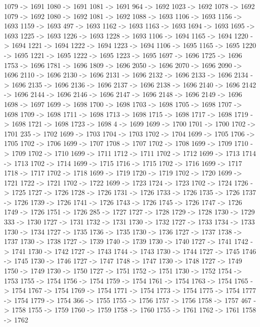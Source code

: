 {	1079 -> 1691
	1080 -> 1691
	1081 -> 1691
	964 -> 1692
	1023 -> 1692
	1078 -> 1692
	1079 -> 1692
	1080 -> 1692
	1081 -> 1692
	1088 -> 1693
	1106 -> 1693
	1156 -> 1693
	1159 -> 1693
	497 -> 1693
	1162 -> 1693
	1163 -> 1693
	1694 -> 1693
	1695 -> 1693
	1225 -> 1693
	1226 -> 1693
	1228 -> 1693
	1106 -> 1694
	1165 -> 1694
	1220 -> 1694
	1221 -> 1694
	1222 -> 1694
	1223 -> 1694
	1106 -> 1695
	1165 -> 1695
	1220 -> 1695
	1221 -> 1695
	1222 -> 1695
	1223 -> 1695
	1697 -> 1696
	1725 -> 1696
	1753 -> 1696
	1781 -> 1696
	1809 -> 1696
	2050 -> 1696
	2070 -> 1696
	2090 -> 1696
	2110 -> 1696
	2130 -> 1696
	2131 -> 1696
	2132 -> 1696
	2133 -> 1696
	2134 -> 1696
	2135 -> 1696
	2136 -> 1696
	2137 -> 1696
	2138 -> 1696
	2140 -> 1696
	2142 -> 1696
	2144 -> 1696
	2146 -> 1696
	2147 -> 1696
	2148 -> 1696
	2149 -> 1696
	1698 -> 1697
	1699 -> 1698
	1700 -> 1698
	1703 -> 1698
	1705 -> 1698
	1707 -> 1698
	1709 -> 1698
	1711 -> 1698
	1713 -> 1698
	1715 -> 1698
	1717 -> 1698
	1719 -> 1698
	1721 -> 1698
	1723 -> 1698
	4 -> 1699
	1699 -> 1700
	1701 -> 1700
	1702 -> 1701
	235 -> 1702
	1699 -> 1703
	1704 -> 1703
	1702 -> 1704
	1699 -> 1705
	1706 -> 1705
	1702 -> 1706
	1699 -> 1707
	1708 -> 1707
	1702 -> 1708
	1699 -> 1709
	1710 -> 1709
	1702 -> 1710
	1699 -> 1711
	1712 -> 1711
	1702 -> 1712
	1699 -> 1713
	1714 -> 1713
	1702 -> 1714
	1699 -> 1715
	1716 -> 1715
	1702 -> 1716
	1699 -> 1717
	1718 -> 1717
	1702 -> 1718
	1699 -> 1719
	1720 -> 1719
	1702 -> 1720
	1699 -> 1721
	1722 -> 1721
	1702 -> 1722
	1699 -> 1723
	1724 -> 1723
	1702 -> 1724
	1726 -> 1725
	1727 -> 1726
	1728 -> 1726
	1731 -> 1726
	1733 -> 1726
	1735 -> 1726
	1737 -> 1726
	1739 -> 1726
	1741 -> 1726
	1743 -> 1726
	1745 -> 1726
	1747 -> 1726
	1749 -> 1726
	1751 -> 1726
	285 -> 1727
	1727 -> 1728
	1729 -> 1728
	1730 -> 1729
	333 -> 1730
	1727 -> 1731
	1732 -> 1731
	1730 -> 1732
	1727 -> 1733
	1734 -> 1733
	1730 -> 1734
	1727 -> 1735
	1736 -> 1735
	1730 -> 1736
	1727 -> 1737
	1738 -> 1737
	1730 -> 1738
	1727 -> 1739
	1740 -> 1739
	1730 -> 1740
	1727 -> 1741
	1742 -> 1741
	1730 -> 1742
	1727 -> 1743
	1744 -> 1743
	1730 -> 1744
	1727 -> 1745
	1746 -> 1745
	1730 -> 1746
	1727 -> 1747
	1748 -> 1747
	1730 -> 1748
	1727 -> 1749
	1750 -> 1749
	1730 -> 1750
	1727 -> 1751
	1752 -> 1751
	1730 -> 1752
	1754 -> 1753
	1755 -> 1754
	1756 -> 1754
	1759 -> 1754
	1761 -> 1754
	1763 -> 1754
	1765 -> 1754
	1767 -> 1754
	1769 -> 1754
	1771 -> 1754
	1773 -> 1754
	1775 -> 1754
	1777 -> 1754
	1779 -> 1754
	366 -> 1755
	1755 -> 1756
	1757 -> 1756
	1758 -> 1757
	467 -> 1758
	1755 -> 1759
	1760 -> 1759
	1758 -> 1760
	1755 -> 1761
	1762 -> 1761
	1758 -> 1762
}
